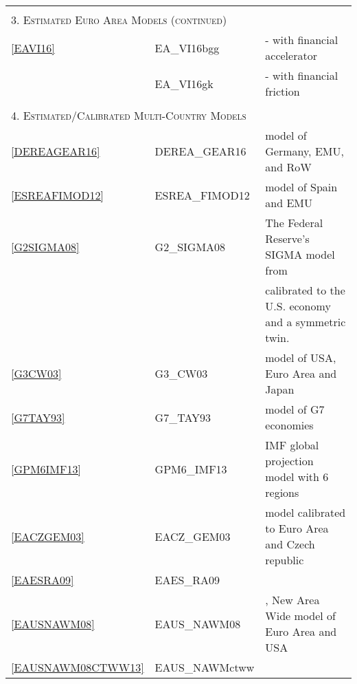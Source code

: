 \documentclass[11pt,a4paper]{article}
\begin{document}
	\begin{table}[H]
		\begin{tabularx}{\textwidth}{lll}
			\hline \hline
			&& \\
			\multicolumn{3}{l}{\textsc{3. Estimated Euro Area Models (continued)}} \\
			\ref{EAVI16} & EA\_VI16bgg & \cite{villa2016} - with \cite{BernankeGertlerGilchrist1999} financial accelerator \\
			& EA\_VI16gk & \cite{villa2016} - with \cite{GertlerKaradi2013} financial friction \\
			&&\\
			\multicolumn{3}{l}{\textsc{4. Estimated/Calibrated Multi-Country Models}} \\
			\ref{DEREAGEAR16}& DEREA\_GEAR16 & \cite{gadatsch2016fiscal} model of Germany, EMU, and RoW\\
			\ref{ESREAFIMOD12} & ESREA\_FIMOD12 & \cite{stahler2012fimod} model of Spain and EMU\\
			\ref{G2SIGMA08} & G2\_SIGMA08 & The Federal Reserve's SIGMA model from \cite{ErcegGuerrieriGust2008}\\
			&& calibrated to the U.S. economy and a symmetric twin.\\
			\ref{G3CW03} & G3\_CW03 & \cite{CoenenWieland2002} model of USA, Euro Area and Japan \\
			\ref{G7TAY93} & G7\_TAY93 & \cite{Taylor1993a} model of G7 economies \\
			\ref{GPM6IMF13} & GPM6\_IMF13 & IMF global projection model with 6 regions \cite{Carabenciovetal2013}\\
			
			\ref{EACZGEM03} & EACZ\_GEM03 & \cite{LaxtonPesenti2003} model calibrated to Euro Area and Czech republic\\
			\ref{EAESRA09} & EAES\_RA09 & \cite{Rabanal2009}\\
			\ref{EAUSNAWM08} & EAUS\_NAWM08 & \cite{CoenenMcAdamStraub2008}, New Area Wide model of Euro Area and USA \\
			\ref{EAUSNAWM08CTWW13} & EAUS\_NAWMctww & \cite{CoganTaylorWielandWolters2013}\\
			

\end{tabularx}
\end{table}
\end{document}
